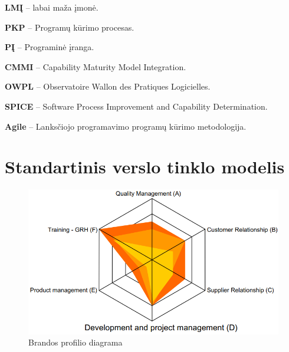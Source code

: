 \documentclass{VUMIFPSkursinis}
\begin{document}

\textbf{LMĮ} – labai maža įmonė.

\textbf{PKP} – Programų kūrimo procesas.

\textbf{PĮ} – Programinė įranga.

\textbf{CMMI} – Capability Maturity Model Integration.

\textbf{OWPL} – Observatoire Wallon des Pratiques Logicielles.

\textbf{SPICE} – Software Process Improvement and Capability Determination.

\textbf{Agile} – Lanksčiojo programavimo programų kūrimo metodologija.

\printbibliography[heading=bibintoc]

\clearpage

\appendix 

\section{Standartinis verslo tinklo modelis}
\begin{figure}[H]
    \centering
    \includegraphics[scale=0.75]{img/diagrama.PNG}
    \caption{Brandos profilio diagrama}
    \label{img:pav-1}
\end{figure}
\end{document}
